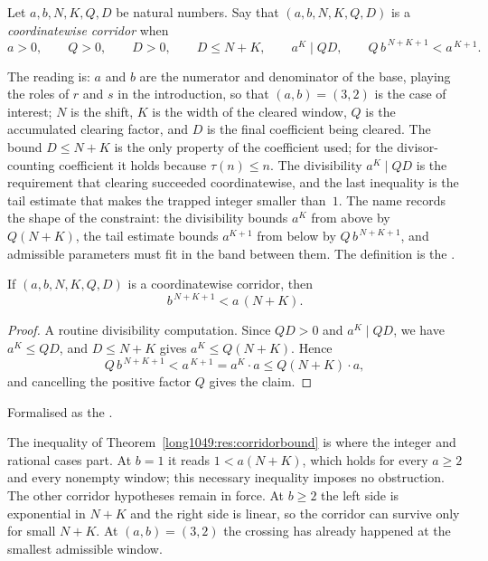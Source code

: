 \documentclass[11pt]{article}
\begin{document}
\begin{definition}\label{long1049:def:corridor}
Let $a,b,N,K,Q,D$ be natural numbers.  Say that $(a,b,N,K,Q,D)$ is a
\emph{coordinatewise corridor} when
\[
 a>0,\qquad Q>0,\qquad D>0,\qquad D\le N+K,\qquad
 a^{K}\mid QD,\qquad Q\,b^{\,N+K+1}<a^{\,K+1}.
\]
\end{definition}

\noindent The reading is: $a$ and $b$ are the numerator and denominator of the
base, playing the roles of $r$ and $s$ in the introduction, so that
$(a,b)=(3,2)$ is the case of interest;
$N$ is the shift, $K$ is the width of the cleared window, $Q$ is the
accumulated clearing factor, and $D$ is the final coefficient being cleared.
The bound $D\le N+K$ is the only property of the coefficient used; for the
divisor-counting coefficient it holds because $\tau(n)\le n$.  The divisibility
$a^{K}\mid QD$ is the requirement that clearing succeeded coordinatewise, and
the last inequality is the tail estimate that makes the trapped integer smaller
than~$1$.  The name records the shape of the constraint: the divisibility
bounds $a^{K}$ from above by $Q(N+K)$, the tail estimate bounds $a^{K+1}$ from
below by $Q\,b^{\,N+K+1}$, and admissible parameters must fit in the band
between them.  The definition is the
.

\begin{theorem}\label{long1049:res:corridorbound}
If $(a,b,N,K,Q,D)$ is a coordinatewise corridor, then
\[
 b^{\,N+K+1}<a\,(N+K).
\]
\end{theorem}

\begin{proof}
A routine divisibility computation.  Since $QD>0$ and $a^{K}\mid QD$, we have
$a^{K}\le QD$, and $D\le N+K$ gives
$a^{K}\le Q(N+K)$.  Hence
\[
 Q\,b^{\,N+K+1}<a^{\,K+1}=a^{K}\cdot a\le Q(N+K)\cdot a,
\]
and cancelling the positive factor $Q$ gives the claim.
\end{proof}

\noindent Formalised as the
.

The inequality of Theorem~\ref{long1049:res:corridorbound} is where the integer and
rational cases part.  At $b=1$ it reads $1<a(N+K)$, which holds for every
$a\ge2$ and every nonempty window; this necessary inequality imposes no
obstruction.  The other corridor hypotheses remain in force.
At $b\ge2$ the left side is exponential in $N+K$ and the right side is linear,
so the corridor can survive only for small $N+K$.  At $(a,b)=(3,2)$ the
crossing has already happened at the smallest admissible window.
\end{document}
